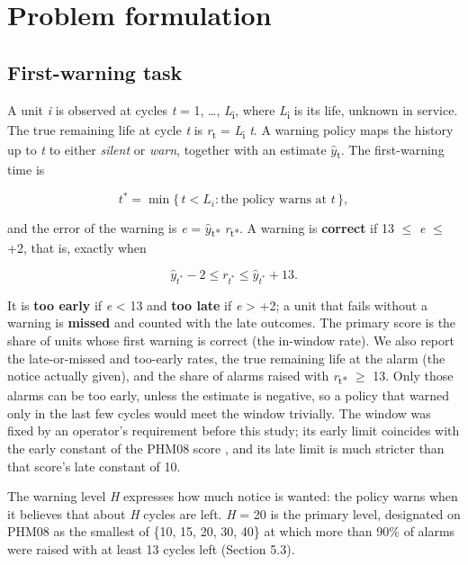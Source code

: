 \documentclass[a4paper,fleqn,doubleblind]{cas-dc}
\begin{document}
\section{Problem formulation}\label{sec:3}

\subsection{First-warning task}

A unit \textit{i} is observed at cycles \textit{t} = 1, \ldots{}, \textit{L}\textsubscript{i}, where \textit{L}\textsubscript{i} is its life, unknown in service. The true remaining life at cycle \textit{t} is \textit{r}\textsubscript{t} = \textit{L}\textsubscript{i} \textminus{} \textit{t}. A warning policy maps the history up to \textit{t} to either \textit{silent} or \textit{warn}, together with an estimate $\hat{y}$\textsubscript{t}. The first-warning time is

\begin{equation}
t^{*} = \min\{\, t < L_i : \text{the policy warns at } t \,\},
\end{equation}

and the error of the warning is \textit{e} = $\hat{y}$\textsubscript{t*} \textminus{} \textit{r}\textsubscript{t*}. A warning is \textbf{correct} if \textminus{}13 $\le$ \textit{e} $\le$ +2, that is, exactly when

\begin{equation}
\hat{y}_{t^*} - 2 \le r_{t^*} \le \hat{y}_{t^*} + 13.
\end{equation}

It is \textbf{too early} if \textit{e} < \textminus{}13 and \textbf{too late} if \textit{e} > +2; a unit that fails without a warning is \textbf{missed} and counted with the late outcomes. The primary score is the share of units whose first warning is correct (the in-window rate). We also report the late-or-missed and too-early rates, the true remaining life at the alarm (the notice actually given), and the share of alarms raised with \textit{r}\textsubscript{t*} $\ge$ 13. Only those alarms can be too early, unless the estimate is negative, so a policy that warned only in the last few cycles would meet the window trivially. The window was fixed by an operator's requirement before this study; its early limit coincides with the early constant of the PHM08 score \cite{saxena2008}, and its late limit is much stricter than that score's late constant of 10.

The warning level \textit{H} expresses how much notice is wanted: the policy warns when it believes that about \textit{H} cycles are left. \textit{H} = 20 is the primary level, designated on PHM08 as the smallest of \{10, 15, 20, 30, 40\} at which more than 90\% of alarms were raised with at least 13 cycles left (Section 5.3).
\end{document}
